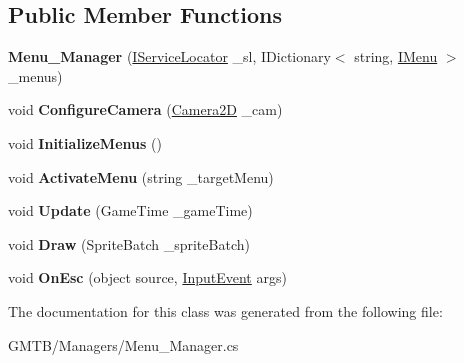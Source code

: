 \subsection*{Public Member Functions}
\begin{DoxyCompactItemize}
\item 
\mbox{\label{class_g_m_t_b_1_1_managers_1_1_menu___manager_a0afa2c6538eebc858b686705f30944a1}} 
{\bfseries Menu\+\_\+\+Manager} (\mbox{\hyperlink{interface_g_m_t_b_1_1_interfaces_1_1_i_service_locator}{I\+Service\+Locator}} \+\_\+sl, I\+Dictionary$<$ string, \mbox{\hyperlink{interface_g_m_t_b_1_1_interfaces_1_1_i_menu}{I\+Menu}} $>$ \+\_\+menus)
\item 
\mbox{\label{class_g_m_t_b_1_1_managers_1_1_menu___manager_ab2d146df99c10f3b05bf882f8bc6fa25}} 
void {\bfseries Configure\+Camera} (\mbox{\hyperlink{class_g_m_t_b_1_1_camera2_d}{Camera2D}} \+\_\+cam)
\item 
\mbox{\label{class_g_m_t_b_1_1_managers_1_1_menu___manager_a959f4300be41924e9750a061ccc43fbb}} 
void {\bfseries Initialize\+Menus} ()
\item 
\mbox{\label{class_g_m_t_b_1_1_managers_1_1_menu___manager_a3b085e6707ddc3be37ef5f3a7afda0b7}} 
void {\bfseries Activate\+Menu} (string \+\_\+target\+Menu)
\item 
\mbox{\label{class_g_m_t_b_1_1_managers_1_1_menu___manager_af2140cb0402cb850f23c758d9c817ae1}} 
void {\bfseries Update} (Game\+Time \+\_\+game\+Time)
\item 
\mbox{\label{class_g_m_t_b_1_1_managers_1_1_menu___manager_a68c733de9f080cb91a0987a374eb6109}} 
void {\bfseries Draw} (Sprite\+Batch \+\_\+sprite\+Batch)
\item 
\mbox{\label{class_g_m_t_b_1_1_managers_1_1_menu___manager_a9d279698b75b64418ab22ed9a0618278}} 
void {\bfseries On\+Esc} (object source, \mbox{\hyperlink{class_g_m_t_b_1_1_input_system_1_1_input_event}{Input\+Event}} args)
\end{DoxyCompactItemize}


The documentation for this class was generated from the following file\+:\begin{DoxyCompactItemize}
\item 
G\+M\+T\+B/\+Managers/Menu\+\_\+\+Manager.\+cs\end{DoxyCompactItemize}
